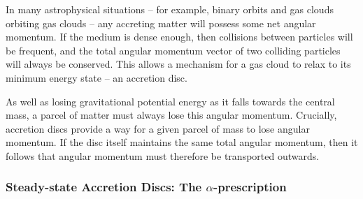 In many astrophysical situations -- for example, 
binary orbits and gas clouds orbiting gas clouds --
any accreting matter will possess some net angular momentum.
If the medium is dense enough, then collisions between particles will be
frequent, and the total angular momentum vector of two colliding particles
will always be conserved. This allows a mechanism for a gas cloud to relax to 
its minimum energy state -- an accretion disc. 

As well as losing gravitational potential energy as it falls towards 
the central mass, a parcel of matter must always lose this angular momentum. 
Crucially, accretion discs provide a way for a given parcel of mass
to lose angular momentum. If the disc itself maintains the same total 
angular momentum, then it follows that angular momentum must 
therefore be transported outwards.




\subsubsection{Steady-state Accretion Discs: The $\alpha$-prescription}

\label{sec:alpha_disc}

